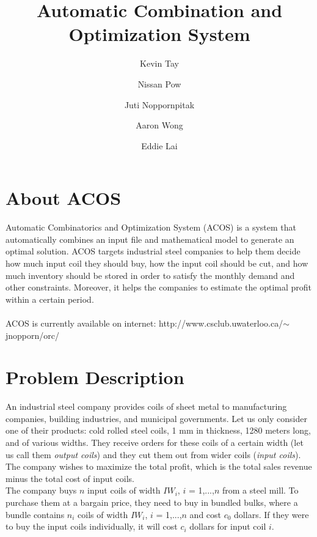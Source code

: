 \documentclass{article}[12pt]
\title{ \bfseries Automatic Combination and Optimization System}
\author{Kevin Tay \and Nissan Pow \and Juti Noppornpitak \and Aaron Wong \and Eddie Lai}
\begin{document}
\maketitle

\newpage

\tableofcontents

\newpage

\section{About ACOS}

Automatic Combinatorics and Optimization System (ACOS) is a system that automatically combines an input file and mathematical model to generate an optimal solution. ACOS targets industrial steel companies to help them decide how much input coil they should buy, how the input coil should be cut, and how much inventory should be stored in order to satisfy the monthly demand and other constraints. Moreover, it helps the companies to estimate the optimal profit within a certain period. \\ \\
ACOS is currently available on internet: http://www.csclub.uwaterloo.ca/$\sim$jnopporn/orc/ \\

\section{Problem Description}

An industrial steel company provides coils of sheet metal to manufacturing companies, building industries, and municipal governments. Let us only consider one of their products: cold rolled steel coils,
1 mm in thickness, 1280 meters long, and of various widths. They receive orders for these coils of a
certain width (let us call them \emph{output coils}) and they cut them out from wider coils (\emph{input coils}). The company wishes to maximize the total profit, which is the total sales revenue minus the total cost of input coils.\\

The company buys $n$ input coils of width $IW_i$, $i$ = 1,...,$n$ from a steel mill. To purchase them
at a bargain price, they need to buy in bundled bulks, where a bundle contains $n_i$ coils of width $IW_i$,
$i$ = 1,...,$n$ and cost $c_0$ dollars. If they were to buy the input coils individually, it will cost $c_i$ dollars
for input coil $i$.\\
\end{document}
